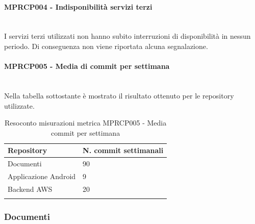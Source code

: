 \paragraph{MPRCP004 - Indisponibilità servizi terzi}\mbox{}\\[0.4cm]
I servizi terzi utilizzati non hanno subito interruzioni di disponibilità in nessun periodo. Di conseguenza non viene riportata alcuna segnalazione.
\paragraph{MPRCP005 - Media di commit per settimana}\mbox{}\\[0.4cm]
Nella tabella sottostante è mostrato il risultato ottenuto per le repository utilizzate.
\begin{center}%
	\centering
	\renewcommand{\arraystretch}{1.5}
	\begin{longtable}{  p{5cm}  p{5cm} }
		\rowcolor{tableHeadYellow}
		\textbf{Repository}   & \textbf{N. commit settimanali} \\ 
		\endhead
		Documenti    &           90                      \\
		Applicazione Android         & 9             \\
		Backend AWS    & 20                           \\
		\rowcolor{white}
		\caption{Resoconto misurazioni metrica MPRCP005 - Media commit per settimana}
	\end{longtable}
\end{center}
\pagebreak
\subsubsection{Documenti}
